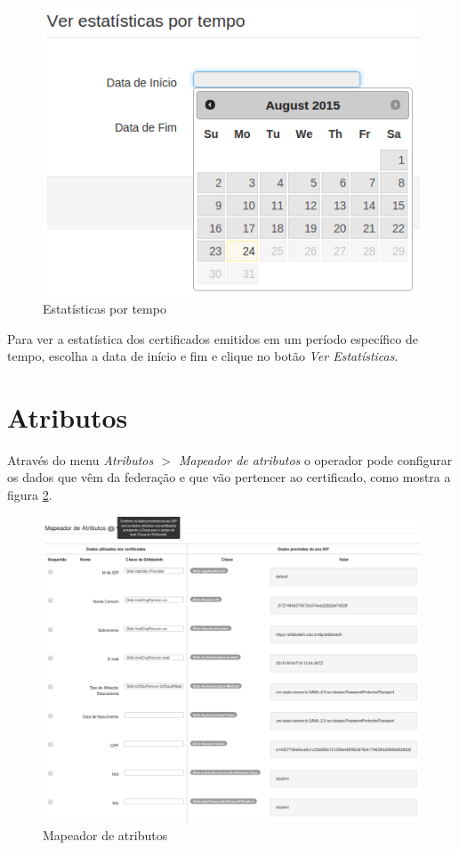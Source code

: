 \begin{figure}[ht]
     \centering
     \includegraphics[scale=0.5]{images/estatisticatempo.png}
     \caption{Estatísticas por tempo}
     \label{fig:estempo}
\end{figure}

Para ver a estatística dos certificados emitidos em um período específico de tempo, escolha a data de início e fim e clique no botão \emph{Ver Estatísticas}.

\section{Atributos}

Através do menu \textit{Atributos $>$ Mapeador de atributos} o operador pode configurar os dados que vêm da federação e que vão pertencer ao certificado, como mostra a figura \ref{fig:atmapop}.

\begin{figure}[ht]
     \centering
     \includegraphics[scale=0.4]{images/oper_attributesmapper.png}
     \caption{Mapeador de atributos}
     \label{fig:atmapop}
\end{figure}

